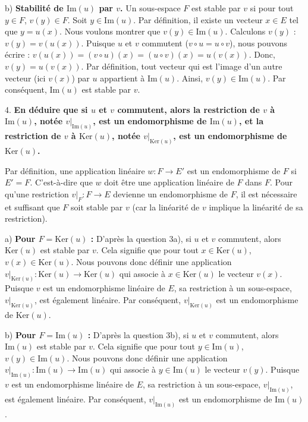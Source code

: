 \documentclass{report}
\begin{document}
    b) \textbf{Stabilité de $\text{Im}(u)$ par $v$.}
    Un sous-espace $F$ est stable par $v$ si pour tout $y \in F$, $v(y) \in F$.
    Soit $y \in \text{Im}(u)$. Par définition, il existe un vecteur $x \in E$ tel que $y = u(x)$.
    Nous voulons montrer que $v(y) \in \text{Im}(u)$.
    Calculons $v(y)$ : $v(y) = v(u(x))$.
    Puisque $u$ et $v$ commutent ($v \circ u = u \circ v$), nous pouvons écrire :
    $v(u(x)) = (v \circ u)(x) = (u \circ v)(x) = u(v(x))$.
    Donc, $v(y) = u(v(x))$.
    Par définition, tout vecteur qui est l'image d'un autre vecteur (ici $v(x)$) par $u$ appartient à $\text{Im}(u)$.
    Ainsi, $v(y) \in \text{Im}(u)$.
    Par conséquent, $\text{Im}(u)$ est stable par $v$.

4.  \textbf{En déduire que si $u$ et $v$ commutent, alors la restriction de $v$ à $\text{Im}(u)$, notée $v|_{\text{Im}(u)}$, est un endomorphisme de $\text{Im}(u)$, et la restriction de $v$ à $\text{Ker}(u)$, notée $v|_{\text{Ker}(u)}$, est un endomorphisme de $\text{Ker}(u)$.}

    Par définition, une application linéaire $w: F \to E'$ est un endomorphisme de $F$ si $E'=F$. C'est-à-dire que $w$ doit être une application linéaire de $F$ dans $F$. Pour qu'une restriction $v|_F : F \to E$ devienne un endomorphisme de $F$, il est nécessaire et suffisant que $F$ soit stable par $v$ (car la linéarité de $v$ implique la linéarité de sa restriction).

    a) \textbf{Pour $F = \text{Ker}(u)$ :}
    D'après la question 3a), si $u$ et $v$ commutent, alors $\text{Ker}(u)$ est stable par $v$.
    Cela signifie que pour tout $x \in \text{Ker}(u)$, $v(x) \in \text{Ker}(u)$.
    Nous pouvons donc définir une application $v|_{\text{Ker}(u)} : \text{Ker}(u) \to \text{Ker}(u)$ qui associe à $x \in \text{Ker}(u)$ le vecteur $v(x)$.
    Puisque $v$ est un endomorphisme linéaire de $E$, sa restriction à un sous-espace, $v|_{\text{Ker}(u)}$, est également linéaire.
    Par conséquent, $v|_{\text{Ker}(u)}$ est un endomorphisme de $\text{Ker}(u)$.

    b) \textbf{Pour $F = \text{Im}(u)$ :}
    D'après la question 3b), si $u$ et $v$ commutent, alors $\text{Im}(u)$ est stable par $v$.
    Cela signifie que pour tout $y \in \text{Im}(u)$, $v(y) \in \text{Im}(u)$.
    Nous pouvons donc définir une application $v|_{\text{Im}(u)} : \text{Im}(u) \to \text{Im}(u)$ qui associe à $y \in \text{Im}(u)$ le vecteur $v(y)$.
    Puisque $v$ est un endomorphisme linéaire de $E$, sa restriction à un sous-espace, $v|_{\text{Im}(u)}$, est également linéaire.
    Par conséquent, $v|_{\text{Im}(u)}$ est un endomorphisme de $\text{Im}(u)$.
\end{document}
